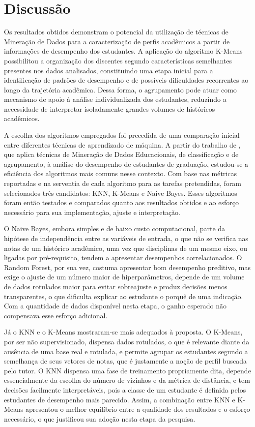 
\section{Discussão}

Os resultados obtidos demonstram o potencial da utilização de técnicas de Mineração de Dados para a caracterização de perfis acadêmicos a partir de informações de desempenho dos estudantes. A aplicação do algoritmo K-Means possibilitou a organização dos discentes segundo características semelhantes presentes nos dados analisados, constituindo uma etapa inicial para a identificação de padrões de desempenho e de possíveis dificuldades recorrentes ao longo da trajetória acadêmica. Dessa forma, o agrupamento pode atuar como mecanismo de apoio à análise individualizada dos estudantes, reduzindo a necessidade de interpretar isoladamente grandes volumes de históricos acadêmicos.

A escolha dos algoritmos empregados foi precedida de uma comparação inicial entre diferentes técnicas de aprendizado de máquina. A partir do trabalho de \citet{asif2017analyzing}, que aplica técnicas de Mineração de Dados Educacionais, de classificação e de agrupamento, à análise do desempenho de estudantes de graduação, estudou-se a eficiência dos algoritmos mais comuns nesse contexto. Com base nas métricas reportadas e na serventia de cada algoritmo para as tarefas pretendidas, foram selecionados três candidatos: KNN, K-Means e Naive Bayes. Esses algoritmos foram então testados e comparados quanto aos resultados obtidos e ao esforço necessário para sua implementação, ajuste e interpretação.

O Naive Bayes, embora simples e de baixo custo computacional, parte da hipótese de independência entre as variáveis de entrada, o que não se verifica nas notas de um histórico acadêmico, uma vez que disciplinas de um mesmo eixo, ou ligadas por pré-requisito, tendem a apresentar desempenhos correlacionados. O Random Forest, por sua vez, costuma apresentar bom desempenho preditivo, mas exige o ajuste de um número maior de hiperparâmetros, depende de um volume de dados rotulados maior para evitar sobreajuste e produz decisões menos transparentes, o que dificulta explicar ao estudante o porquê de uma indicação. Com a quantidade de dados disponível nesta etapa, o ganho esperado não compensava esse esforço adicional.

Já o KNN e o K-Means mostraram-se mais adequados à proposta. O K-Means, por ser não supervisionado, dispensa dados rotulados, o que é relevante diante da ausência de uma base real e rotulada, e permite agrupar os estudantes segundo a semelhança de seus vetores de notas, que é justamente a noção de perfil buscada pelo tutor. O KNN dispensa uma fase de treinamento propriamente dita, depende essencialmente da escolha do número de vizinhos e da métrica de distância, e tem decisões facilmente interpretáveis, pois a classe de um estudante é definida pelos estudantes de desempenho mais parecido. Assim, a combinação entre KNN e K-Means apresentou o melhor equilíbrio entre a qualidade dos resultados e o esforço necessário, o que justificou sua adoção nesta etapa da pesquisa.

